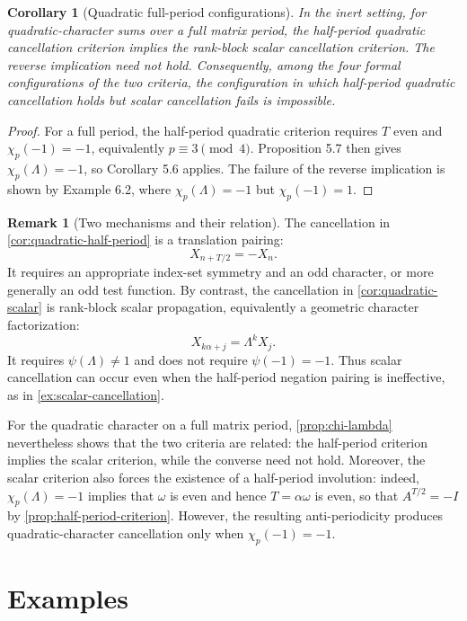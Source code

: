 \documentclass[11pt]{article}
\newcommand{\chiP}{\chi_p}
\theoremstyle{plain}
\newtheorem{corollary}[theorem]{Corollary}
\theoremstyle{definition}
\newtheorem{remark}[theorem]{Remark}
\begin{document}
\begin{corollary}[Quadratic full-period configurations]
In the inert setting, for quadratic-character sums over a full matrix period, the half-period quadratic cancellation criterion implies the rank-block scalar cancellation criterion. The reverse implication need not hold. Consequently, among the four formal configurations of the two criteria, the configuration in which half-period quadratic cancellation holds but scalar cancellation fails is impossible.
\end{corollary}

\begin{proof}
For a full period, the half-period quadratic criterion requires $T$ even and $\chi_p(-1)=-1$, equivalently $p\equiv 3\pmod 4$. Proposition 5.7 then gives $\chi_p(\Lambda)=-1$, so Corollary 5.6 applies. The failure of the reverse implication is shown by Example 6.2, where $\chi_p(\Lambda)=-1$ but $\chi_p(-1)=1$.
\end{proof}


\begin{remark}[Two mechanisms and their relation]
\label{rem:two-mechanisms}
The cancellation in \cref{cor:quadratic-half-period} is a translation pairing:
\[
 X_{n+T/2}=-X_n.
\]
It requires an appropriate index-set symmetry and an odd character, or more generally an odd test function. By contrast, the cancellation in \cref{cor:quadratic-scalar} is rank-block scalar propagation, equivalently a geometric character factorization:
\[
 X_{k\alpha+j}=\Lambda^kX_j.
\]
It requires $\psi(\Lambda)\neq1$ and does not require $\psi(-1)=-1$. Thus scalar cancellation can occur even when the half-period negation pairing is ineffective, as in \cref{ex:scalar-cancellation}.

For the quadratic character on a full matrix period, \cref{prop:chi-lambda} nevertheless shows that the two criteria are related: the half-period criterion implies the scalar criterion, while the converse need not hold. Moreover, the scalar criterion also forces the existence of a half-period involution:
indeed, $\chiP(\Lambda)=-1$ implies that $\omega$ is even and hence
$T=\alpha\omega$ is even, so that $A^{T/2}=-I$ by
\cref{prop:half-period-criterion}. However, the resulting anti-periodicity
produces quadratic-character cancellation only when
$\chiP(-1)=-1$.
\end{remark}

\section{Examples}
\end{document}
